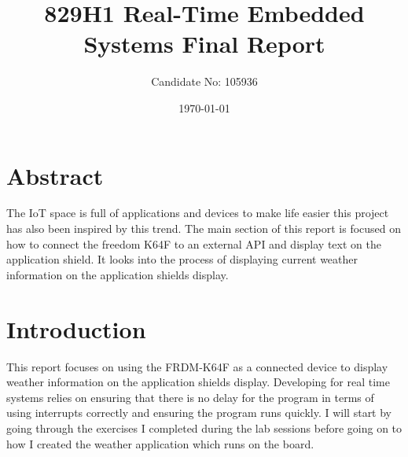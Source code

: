 \documentclass[a4paper,12pt]{scrartcl}
\title{829H1 Real-Time Embedded Systems Final Report}
\author{Candidate No: 105936}
\date{\today}
\begin{document}
	
	\begin{titlepage}
		\maketitle
	\end{titlepage}
	
	\tableofcontents
	\newpage

	\section{Abstract}
	{
		The IoT space is full of applications and devices to make life easier this project has also been inspired by this trend. The main section of this report is focused on how to connect the freedom K64F\cite{nxpproducts2014} to an external API and display text on the application shield. It looks into the process of displaying current weather information on the application shields display.
	}

	\section{Introduction}
	{
		This report focuses on using the FRDM-K64F\cite{nxpproducts2014} as a connected device to display weather information on the application shields display. Developing for real time systems relies on ensuring that there is no delay for the program in terms of using interrupts correctly and ensuring the program runs quickly. I will start by going through the exercises I completed during the lab sessions before going on to how I created the weather application which runs on the board. 
	}
	
\end{document}
